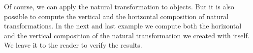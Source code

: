 

Of course, we can apply the natural transformation to objects. But it is also possible to compute the vertical and the horizontal composition of natural transformations.
In the next and last example we compute both the horizontal and the vertical composition of the natural transformation we created with itself. We leave it to the
reader to verify the results.

\begin{small}

\end{small}